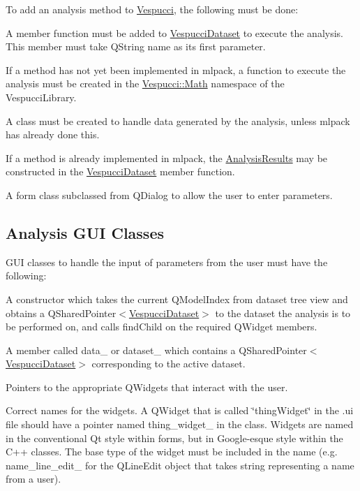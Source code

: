 To add an analysis method to \hyperlink{namespace_vespucci}{Vespucci}, the following must be done\+:
\begin{DoxyItemize}
\item A member function must be added to {\ttfamily \hyperlink{class_vespucci_dataset}{Vespucci\+Dataset}} to execute the analysis. This member must take {\ttfamily Q\+String name} as its first parameter.
\item If a method has not yet been implemented in mlpack, a function to execute the analysis must be created in the {\ttfamily \hyperlink{namespace_vespucci_1_1_math}{Vespucci\+::\+Math}} namespace of the Vespucci\+Library.
\item A class must be created to handle data generated by the analysis, unless mlpack has already done this.
\item If a method is already implemented in mlpack, the {\ttfamily \hyperlink{class_analysis_results}{Analysis\+Results}} may be constructed in the {\ttfamily \hyperlink{class_vespucci_dataset}{Vespucci\+Dataset}} member function.
\item A form class subclassed from {\ttfamily Q\+Dialog} to allow the user to enter parameters.
\end{DoxyItemize}

\subsection*{Analysis G\+UI Classes }

G\+UI classes to handle the input of parameters from the user must have the following\+:
\begin{DoxyItemize}
\item A constructor which takes the current {\ttfamily Q\+Model\+Index} from dataset tree view and obtains a {\ttfamily Q\+Shared\+Pointer$<$\hyperlink{class_vespucci_dataset}{Vespucci\+Dataset}$>$} to the dataset the analysis is to be performed on, and calls {\ttfamily find\+Child} on the required {\ttfamily Q\+Widget} members.
\item A member called {\ttfamily data\+\_\+} or {\ttfamily dataset\+\_\+} which contains a {\ttfamily Q\+Shared\+Pointer$<$\hyperlink{class_vespucci_dataset}{Vespucci\+Dataset}$>$} corresponding to the active dataset.
\item Pointers to the appropriate {\ttfamily Q\+Widget}s that interact with the user.
\item Correct names for the widgets. A {\ttfamily Q\+Widget} that is called \char`\"{}thing\+Widget\char`\"{} in the .ui file should have a pointer named {\ttfamily thing\+\_\+widget\+\_\+} in the class. Widgets are named in the conventional Qt style within forms, but in Google-\/esque style within the C++ classes. The base type of the widget must be included in the name (e.\+g. {\ttfamily name\+\_\+line\+\_\+edit\+\_\+} for the {\ttfamily Q\+Line\+Edit} object that takes string representing a name from a user).
\end{DoxyItemize}

